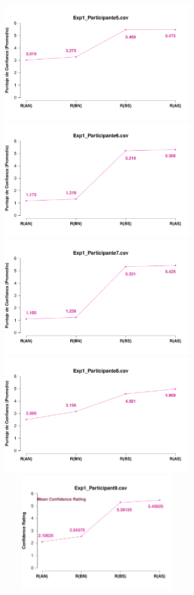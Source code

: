 \documentclass[a4paper ]{article}
\begin{document}
\begin{figure}[th]
\includegraphics[width=9cm, height=5cm]{Figures/MirrorRating_Exp1_P5} \includegraphics[width=9cm, height=5cm]{Figures/MirrorRating_Exp1_P6}
\includegraphics[width=9cm, height=5cm]{Figures/MirrorRating_Exp1_P7} \includegraphics[width=9cm, height=5cm]{Figures/MirrorRating_Exp1_P8} 
\includegraphics[width=9cm, height=5cm]{Figures/MirrorRating_Exp1_P9}
\end{figure}
\end{document}
